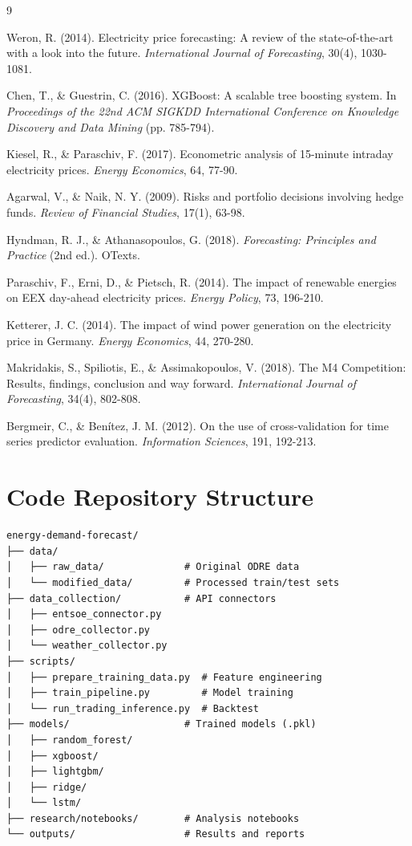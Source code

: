 \documentclass[11pt,a4paper]{article}
\begin{document}
\begin{thebibliography}{9}

Weron, R. (2014). Electricity price forecasting: A review of the state-of-the-art with a look into the future. \textit{International Journal of Forecasting}, 30(4), 1030-1081.

Chen, T., \& Guestrin, C. (2016). XGBoost: A scalable tree boosting system. In \textit{Proceedings of the 22nd ACM SIGKDD International Conference on Knowledge Discovery and Data Mining} (pp. 785-794).

Kiesel, R., \& Paraschiv, F. (2017). Econometric analysis of 15-minute intraday electricity prices. \textit{Energy Economics}, 64, 77-90.

Agarwal, V., \& Naik, N. Y. (2009). Risks and portfolio decisions involving hedge funds. \textit{Review of Financial Studies}, 17(1), 63-98.

Hyndman, R. J., \& Athanasopoulos, G. (2018). \textit{Forecasting: Principles and Practice} (2nd ed.). OTexts.

Paraschiv, F., Erni, D., \& Pietsch, R. (2014). The impact of renewable energies on EEX day-ahead electricity prices. \textit{Energy Policy}, 73, 196-210.

Ketterer, J. C. (2014). The impact of wind power generation on the electricity price in Germany. \textit{Energy Economics}, 44, 270-280.

Makridakis, S., Spiliotis, E., \& Assimakopoulos, V. (2018). The M4 Competition: Results, findings, conclusion and way forward. \textit{International Journal of Forecasting}, 34(4), 802-808.

Bergmeir, C., \& Benítez, J. M. (2012). On the use of cross-validation for time series predictor evaluation. \textit{Information Sciences}, 191, 192-213.

\end{thebibliography}

\appendix

\section{Code Repository Structure}

\begin{lstlisting}
energy-demand-forecast/
├── data/
│   ├── raw_data/              # Original ODRE data
│   └── modified_data/         # Processed train/test sets
├── data_collection/           # API connectors
│   ├── entsoe_connector.py
│   ├── odre_collector.py
│   └── weather_collector.py
├── scripts/
│   ├── prepare_training_data.py  # Feature engineering
│   ├── train_pipeline.py         # Model training
│   └── run_trading_inference.py  # Backtest
├── models/                    # Trained models (.pkl)
│   ├── random_forest/
│   ├── xgboost/
│   ├── lightgbm/
│   ├── ridge/
│   └── lstm/
├── research/notebooks/        # Analysis notebooks
└── outputs/                   # Results and reports
\end{lstlisting}
\end{document}
